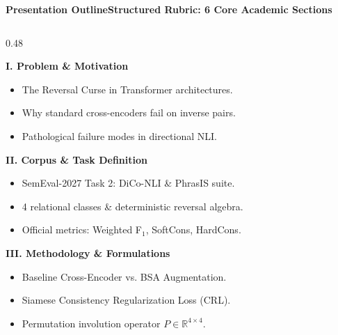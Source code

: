 \documentclass[aspectratio=169,10pt]{beamer}
\begin{document}
\begin{frame}{\textbf{Presentation Outline}}{\textbf{Structured Rubric: 6 Core Academic Sections}}
  \begin{columns}[T]
    \begin{column}{0.48\textwidth}
      \begin{block}{\textbf{I. Problem \& Motivation}}
        \small
        \begin{itemize}
          \item The Reversal Curse in Transformer architectures.
          \item Why standard cross-encoders fail on inverse pairs.
          \item Pathological failure modes in directional NLI.
        \end{itemize}
      \end{block}
      \vspace{0.15cm}
      \begin{block}{\textbf{II. Corpus \& Task Definition}}
        \small
        \begin{itemize}
          \item SemEval-2027 Task 2: DiCo-NLI \& PhrasIS suite.
          \item 4 relational classes \& deterministic reversal algebra.
          \item Official metrics: Weighted F$_1$, SoftCons, HardCons.
        \end{itemize}
      \end{block}
      \vspace{0.15cm}
      \begin{block}{\textbf{III. Methodology \& Formulations}}
        \small
        \begin{itemize}
          \item Baseline Cross-Encoder vs. BSA Augmentation.
          \item Siamese Consistency Regularization Loss (CRL).
          \item Permutation involution operator $P \in \mathbb{R}^{4 \times 4}$.
        \end{itemize}
      \end{block}
    \end{column}


\end{columns}
\end{frame}
\end{document}
